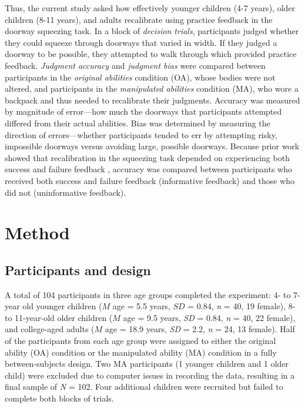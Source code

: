 \documentclass[a4paper,man,natbib,floatsintext,noextraspace]{apa6}
\begin{document}
Thus, the current study asked how effectively younger children (4-7 years), older children (8-11 years), and adults recalibrate using practice feedback in the doorway squeezing task. In a block of \textit{decision trials}, participants judged whether they could squeeze through doorways that varied in width. If they judged a doorway to be possible, they attempted to walk through which provided practice feedback. \textit{Judgment accuracy} and \textit{judgment bias} were compared between participants in the \textit{original abilities} condition (OA), whose bodies were not altered, and participants in the \textit{manipulated abilities} condition (MA), who wore a backpack and thus needed to recalibrate their judgments. Accuracy was measured by magnitude of error---how much the doorways that participants attempted differed from their actual abilities. Bias was determined by measuring the direction of errors---whether participants tended to err by attempting risky, impossible doorways versus avoiding large, possible doorways. Because prior work showed that recalibration in the squeezing task depended on experiencing both success and failure feedback \citep{DoorwayLearning}, accuracy was compared between participants who received both success and failure feedback (informative feedback) and those who did not (uninformative feedback).

\section{Method}

\subsection{Participants and design}

A total of 104 participants in three age groups completed the experiment: 4- to 7-year old younger children ($M$ age = 5.5 years, $SD$ = 0.84, \textit{n} = 40, 19 female), 8- to 11-year-old older children ($M$ age = 9.5 years, \textit{SD} = 0.84, \textit{n} = 40, 22 female), and college-aged adults ($M$ age = 18.9 years, \textit{SD} = 2.2, \textit{n} = 24, 13 female). Half of the participants from each age group were assigned to either the original ability (OA) condition or the manipulated ability (MA) condition in a fully between-subjects design. Two MA participants (1 younger children and 1 older child) were excluded due to computer issues in recording the data, resulting in a final sample of \textit{N} = 102. Four additional children were recruited but failed to complete both blocks of trials. 
\end{document}
